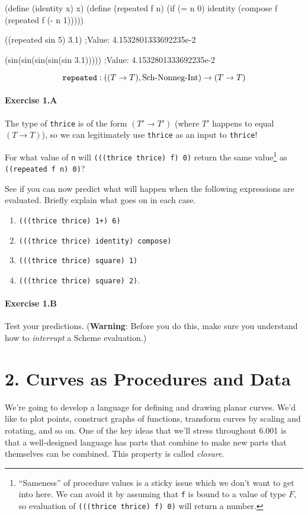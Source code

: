 \beginlisp
(define (identity x) x)
\null
(define (repeated f n)
  (if (= n 0)
      identity
      (compose f (repeated f (- n 1)))))

\null

((repeated sin 5) 3.1)
;Value: 4.1532801333692235e-2

\null

(sin(sin(sin(sin(sin 3.1)))))
;Value: 4.1532801333692235e-2
\endlisp

\[\hbox{\tt repeated} : ((T\rightarrow T),\mbox{Sch-Nonneg-Int}) \rightarrow (T\rightarrow T)\]

\paragraph{Exercise 1.A} The type of {\tt thrice} is of the form
$(T'\to T')$ (where $T'$ happens to equal $(T\to T)$), so we can
legitimately use {\tt thrice} as an input to {\tt thrice}!

For what value of {\tt n} will {\tt (((thrice thrice) f) 0)} return the
same value\footnote{``Sameness'' of procedure values is a sticky issue
which we don't want to get into here.  We can avoid it by assuming that
{\tt f} is bound to a value of type $F$, so evaluation of {\tt (((thrice
thrice) f) 0)} will return a number.} as {\tt ((repeated f n) 0)}?

See if you can now predict what will happen when the following expressions
are evaluated.  Briefly explain what goes on in each case.
\begin{enumerate}
\item {\tt (((thrice thrice) 1+) 6)}
\item {\tt (((thrice thrice) identity) compose)}
\item {\tt (((thrice thrice) square) 1)}
\item {\tt (((thrice thrice) square) 2)}.
\end{enumerate}

\paragraph{Exercise 1.B}  Test your predictions.  ({\bf Warning}:
Before you do this, make sure you understand how to {\em interrupt} a
Scheme evaluation.)

\section{2. Curves as Procedures and Data}

We're going to develop a language for defining and drawing planar curves.
We'd like to plot points, construct graphs of functions, transform curves
by scaling and rotating, and so on.  One of the key ideas that we'll
stress throughout 6.001 is that a well-designed language has parts that
combine to make new parts that themselves can be combined.  This property
is called {\em closure}.

